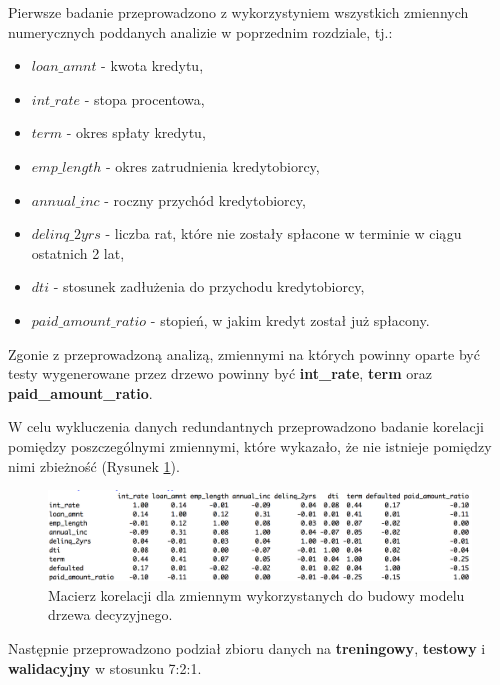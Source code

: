 Pierwsze badanie przeprowadzono z wykorzystyniem wszystkich zmiennych numerycznych poddanych analizie w poprzednim rozdziale, tj.:


\begin{itemize}
	\item $loan\_amnt$ - kwota kredytu,
	\item $int\_rate$ - stopa procentowa,
	\item $term$ - okres spłaty kredytu,
	\item $emp\_length$ - okres zatrudnienia kredytobiorcy,
	\item $annual\_inc$ - roczny przychód kredytobiorcy,
	\item $delinq\_2yrs$ - liczba rat, które nie zostały spłacone w terminie w ciągu ostatnich 2 lat,
	\item $dti$ - stosunek zadłużenia do przychodu kredytobiorcy,
	\item $paid\_amount\_ratio$ - stopień, w jakim kredyt został już spłacony.
\end{itemize}

Zgonie z przeprowadzoną analizą, zmiennymi na których powinny oparte być testy wygenerowane przez drzewo powinny być \textbf{int\_rate}, \textbf{term} oraz \textbf{paid\_amount\_ratio}.

W celu wykluczenia danych redundantnych przeprowadzono badanie korelacji pomiędzy poszczególnymi zmiennymi, które wykazało, że nie istnieje pomiędzy nimi zbieżność (Rysunek \ref{tree:correlation}).

\begin{figure}[h] \centering %
	\includegraphics[scale=0.5]{img/tree_correlation.png}
	\caption{Macierz korelacji dla zmiennym wykorzystanych do budowy modelu drzewa decyzyjnego.}
	\label{tree:correlation}
\end{figure}

Następnie przeprowadzono podział zbioru danych na \textbf{treningowy}, \textbf{testowy} i \textbf{walidacyjny} w stosunku 7:2:1.

